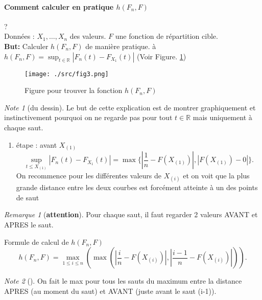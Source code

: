 \documentclass{article}
\theoremstyle{plain}%
\theoremstyle{definition}
\theoremstyle{remark}
\newtheorem*{rem}{Remarque}
\newtheorem*{note}{Note}
\begin{document}
\paragraph{Comment calculer en pratique $ h(F_n,F) $} ? \\ 

Données : $ X_1, \dots, X_n $ des valeurs. $ F $ une fonction de répartition cible. \\
\textbf{But:} Calculer $ h(F_n,F) $ de manière pratique. à $ h(F_n, F) = \sup_{t \in \mathbb{R}} \left| F_n(t) - F_{X_1}(t) \right| $ (Voir Figure. \ref{fig3})

\begin{figure}[!htbp]
    \centering
    \texttt{[image: ./src/fig3.png]}
    \caption{Figure pour trouver la fonction $ h(F_n, F) $ }
    \label{fig3}
\end{figure}
\begin{note}[du dessin]
    Le but de cette explication est de montrer graphiquement et instinctivement pourquoi on ne regarde pas pour tout $ t \in \mathbb{R} $ mais uniquement à chaque saut.
\end{note}

\begin{enumerate}
    \item étape : avant $ X_(1) $ 
    \[
        \sup_{t \leq X_{(1)}} \left| F_n(t) - F_{X_1}(t) \right| = \max \{ \left| \frac{1}{n} - F(X_{(1)}) \right| , \left| F(X_{(1)}) - 0 \right| \}
    .\]
    On recommence pour les différentes valeurs de $ X_{(i)} $ et on voit que la plus grande distance entre les deux courbes est forcément atteinte à un des points de saut
\end{enumerate}

\begin{rem}[\textbf{attention}]
    Pour chaque saut, il faut regarder 2 valeurs AVANT et APRES le saut.
\end{rem}

Formule de calcul de $ h(F_n, F) $ 
\[
    h(F_n, F) = \max _{1 \leq i \leq n} ( \max ( \left| \frac{i}{n} - F(X_{(i)}) \right| , \left| \frac{i-1}{n}- F(X_{(i)}) \right|  ))
.\]
\begin{note}[]
    On fait le max pour tous les sauts du maximum entre la distance APRES (au moment du saut) et AVANT (juste avant le saut (i-1)).
\end{note}
\end{document}
